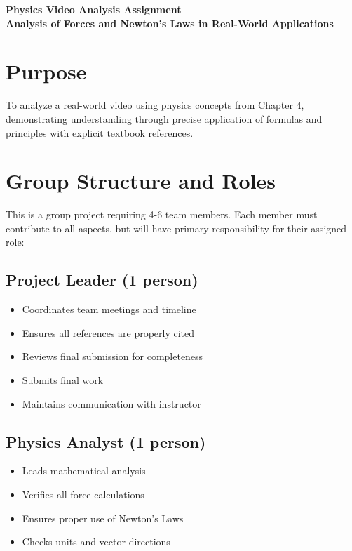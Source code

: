 \documentclass[12pt]{article}
\begin{document}
\begin{center}
{\LARGE\bfseries Physics Video Analysis Assignment\\[0.5cm]}
{\large\bfseries Analysis of Forces and Newton's Laws in Real-World Applications}\\[1cm]
\end{center}

\section*{Purpose}
To analyze a real-world video using physics concepts from Chapter 4, demonstrating understanding through precise application of formulas and principles with explicit textbook references.

\section{Group Structure and Roles}
This is a group project requiring 4-6 team members. Each member must contribute to all aspects, but will have primary responsibility for their assigned role:

\subsection{Project Leader (1 person)}
\begin{itemize}
\item Coordinates team meetings and timeline
\item Ensures all references are properly cited
\item Reviews final submission for completeness
\item Submits final work
\item Maintains communication with instructor
\end{itemize}

\subsection{Physics Analyst (1 person)}
\begin{itemize}
\item Leads mathematical analysis
\item Verifies all force calculations
\item Ensures proper use of Newton's Laws
\item Checks units and vector directions
\end{itemize}
\end{document}
